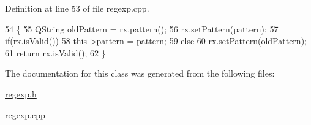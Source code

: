 Definition at line 53 of file regexp.\+cpp.


\begin{DoxyCode}
54 \{
55     QString oldPattern = rx.pattern();
56     rx.setPattern(pattern);
57     \textcolor{keywordflow}{if}(rx.isValid())
58         this->pattern = pattern;
59     \textcolor{keywordflow}{else}
60         rx.setPattern(oldPattern);
61     \textcolor{keywordflow}{return} rx.isValid();
62 \}
\end{DoxyCode}


The documentation for this class was generated from the following files\+:\begin{DoxyCompactItemize}
\item 
\hyperlink{regexp_8h}{regexp.\+h}\item 
\hyperlink{regexp_8cpp}{regexp.\+cpp}\end{DoxyCompactItemize}
